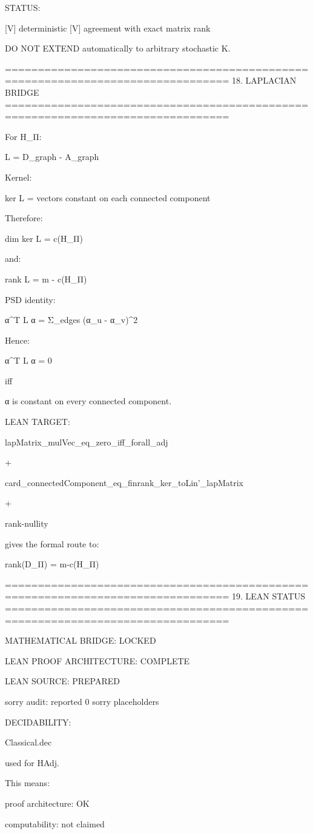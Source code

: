 STATUS:

[V] deterministic
[V] agreement with exact matrix rank

DO NOT EXTEND automatically to arbitrary stochastic K.

================================================================================
18. LAPLACIAN BRIDGE
================================================================================

For H_Π:

L = D_graph - A_graph

Kernel:

ker L
=
{vectors constant on each connected component}

Therefore:

dim ker L
=
c(H_Π)

and:

rank L
=
m - c(H_Π)

PSD identity:

α^T L α
=
Σ_edges (α_u - α_v)^2

Hence:

α^T L α = 0

iff

α is constant on every connected component.

LEAN TARGET:

lapMatrix_mulVec_eq_zero_iff_forall_adj

+

card_connectedComponent_eq_finrank_ker_toLin'_lapMatrix

+

rank-nullity

gives the formal route to:

rank(D_Π) = m-c(H_Π)

================================================================================
19. LEAN STATUS
================================================================================

MATHEMATICAL BRIDGE:
LOCKED

LEAN PROOF ARCHITECTURE:
COMPLETE

LEAN SOURCE:
PREPARED

sorry audit:
reported 0 sorry placeholders

DECIDABILITY:

Classical.dec

used for HAdj.

This means:

proof architecture:
OK

computability:
not claimed


